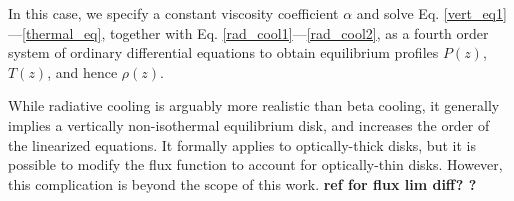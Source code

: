 In this case, we specify a constant viscosity coefficient $\alpha$ and
solve Eq. \ref{vert_eq1}---\ref{thermal_eq}, together with
Eq. \ref{rad_cool1}---\ref{rad_cool2}, as a fourth order system of
ordinary differential equations to obtain equilibrium profiles $P(z)$, $T(z)$, and hence
$\rho(z)$.  

While radiative cooling is arguably more realistic than
beta cooling, it generally implies a vertically
non-isothermal equilibrium disk, and increases the order of the
linearized equations. It formally applies to optically-thick 
disks, but it is possible to modify the flux function to account
for optically-thin disks. However, this complication is beyond the scope of
this work. {\bf ref for flux lim diff? \citep{levermore81}?}


